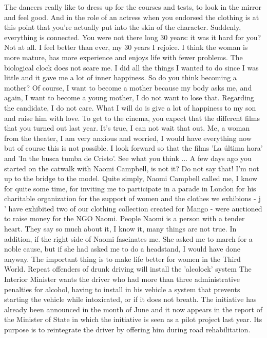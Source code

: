 The dancers really like to dress up for the courses and tests, to look in the mirror and feel good.
And in the role of an actress when you endorsed the clothing is at this point that you're actually put into the skin of the character.
Suddenly, everything is connected.
You were not there long 30 years: it was it hard for you?
Not at all.
I feel better than ever, my 30 years I rejoice.
I think the woman is more mature, has more experience and enjoys life with fewer problems.
The biological clock does not scare me.
I did all the things I wanted to do since I was little and it gave me a lot of inner happiness.
So do you think becoming a mother?
Of course, I want to become a mother because my body asks me, and again, I want to become a young mother, I do not want to lose that.
Regarding the candidate, I do not care.
What I will do is give a lot of happiness to my son and raise him with love.
To get to the cinema, you expect that the different films that you turned out last year.
It's true, I can not wait that out.
Me, a woman from the theater, I am very anxious and worried, I would have everything now but of course this is not possible.
I look forward so that the films 'La última hora' and 'In the busca tumba de Cristo'.
See what you think ...
A few days ago you started on the catwalk with Naomi Campbell, is not it?
Do not say that!
I'm not up to the bridge to the model.
Quite simply, Naomi Campbell called me, I know for quite some time, for inviting me to participate in a parade in London for his charitable organization for the support of women and the clothes we exhibions - j ' have exhibited two of our clothing collection created for Mango - were auctioned to raise money for the NGO Naomi.
People Naomi is a person with a tender heart.
They say so much about it, I know it, many things are not true.
In addition, if the right side of Naomi fascinates me.
She asked me to march for a noble cause, but if she had asked me to do a headstand, I would have done anyway.
The important thing is to make life better for women in the Third World.
Repeat offenders of drunk driving will install the 'alcolock' system
The Interior Minister wants the driver who had more than three administrative penalties for alcohol, having to install in his vehicle a system that prevents starting the vehicle while intoxicated, or if it does not breath.
The initiative has already been announced in the month of June and it now appears in the report of the Minister of State in which the initiative is seen as a pilot project last year.
Its purpose is to reintegrate the driver by offering him during road rehabilitation.
